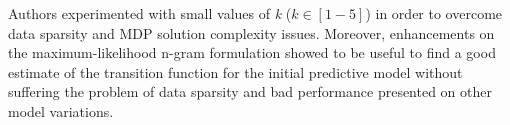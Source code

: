 Authors experimented with small values of \textit{k} ($k \in [1-5]$) in order to overcome data sparsity and MDP solution complexity issues. Moreover, enhancements on the maximum-likelihood n-gram formulation showed to be useful to find a good estimate of the transition function for the initial predictive model without suffering the problem of data sparsity and bad performance presented on other model variations.

%
%
%
